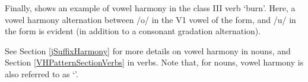 Finally,  shows an example of vowel harmony in the class III verb  ‘burn’. Here, a vowel harmony alternation between /o/ in the V1 vowel of the  form, and /u/ in the  form is evident (in addition to a consonant gradation alternation). 
\ea\label{vhEx3}%
\z


See Section \ref{jSuffixHarmony} for more details on vowel harmony in nouns, and Section \ref{VHPatternSectionVerbs} in verbs. Note that, for nouns, vowel harmony is also referred to as ‘\jvh’.






